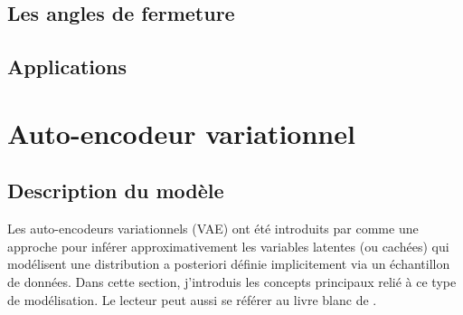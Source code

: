 
\subsection{Les angles de fermeture}

\subsection{Applications}


\section{Auto-encodeur variationnel}

\subsection{Description du modèle}

Les auto-encodeurs variationnels (VAE) ont été introduits par \citet{Kingma2013} comme une approche 
pour inférer approximativement les variables latentes (ou cachées) qui modélisent une distribution 
a posteriori définie implicitement via un échantillon de données. Dans cette section, j'introduis 
les concepts principaux relié à ce type de modélisation. 
Le lecteur peut aussi se référer au livre blanc de \citet{Kingma2019}.

